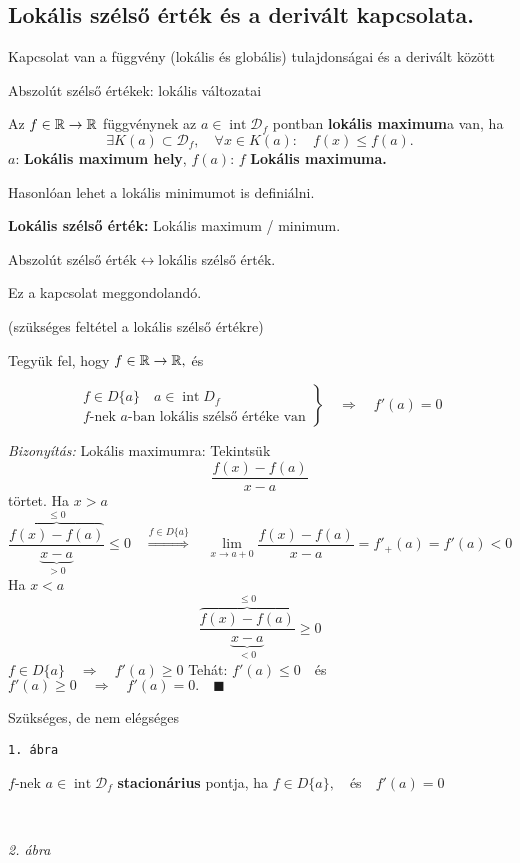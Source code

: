 \documentclass[a4paper,11.5pt]{article}
\DeclareMathOperator{\Int}{int}
\begin{document}
	\subsection{Lokális szélső érték és a derivált kapcsolata.}
	\begin{note}
		Kapcsolat van a függvény (lokális és globális) tulajdonságai és a derivált között
	\end{note}
	\begin{revision}
		Abszolút szélső értékek: lokális változatai
	\end{revision}
	\begin{definition}
		Az $f\in\mathbb{R}\to\mathbb{R}$ függvénynek az $a\in\Int \mathcal{D}_f$ pontban \textbf{lokális maximum}a van, ha
		\[ \exists K(a)\subset \mathcal{D}_f,\quad \forall x\in K(a):\quad f(x)\leq f(a). \]
		$a$: \textbf{Lokális maximum hely},
		\quad $f(a)$: $f$ \textbf{Lokális maximuma.}
		
		\medskip
		Hasonlóan lehet a lokális minimumot is definiálni.
		\medskip
		
		\textbf{Lokális szélső érték:} Lokális maximum / minimum.
	\end{definition}
	\begin{note}
		Abszolút szélső érték\quad$ \longleftrightarrow$\quad lokális szélső érték.
		
		Ez a kapcsolat meggondolandó.
	\end{note}
	\begin{theorem}
		(szükséges feltétel a lokális szélső értékre)
		
		Tegyük fel, hogy $f\in\mathbb{R}\to\mathbb{R},$ és 
		
		\[\left.\begin{gathered}
		f\in D\{a\}\quad a\in\Int D_f\\
		f\text{-nek } a\text{-ban lokális szélső értéke van}
		\end{gathered}\right\}\quad \Rightarrow\quad f'(a)=0\]
		
		\textit{Bizonyítás:} Lokális maximumra:
		Tekintsük
		\[ \frac{f(x)-f(a)}{x-a} \]
		törtet. Ha $x>a$
		\[ \frac{\overbrace{f(x)-f(a)}^{\leq 0}}{\underbrace{x-a}_{>0}}\leq 0\quad \overset{f\in D\{a\}}{\Rightarrow}\quad \lim_{x\to a+0}\frac{f(x)-f(a)}{x-a}=f'_+(a)=f'(a)<0 \]
		Ha $x<a$
		\[ \frac{\overbrace{f(x)-f(a)}^{\leq 0}}{\underbrace{x-a}_{<0}}\geq 0 \]
		$f\in D\{a\}\quad \Rightarrow\quad f'(a)\geq0$
		Tehát: $f'(a)\leq0\quad $és\quad $f'(a)\geq0\quad  \Rightarrow\quad f'(a)=0.\quad \blacksquare$
	\end{theorem}
	\begin{note}
		Szükséges, de nem elégséges
		\begin{center}
			
		\texttt{1. ábra}
		\end{center}
	\end{note}
	\begin{definition}
		$f$-nek $a\in\Int \mathcal{D}_f$ \textbf{stacionárius} pontja, ha $f\in D\{a\},\quad $és$\quad f'(a)=0$
	\end{definition}
	\begin{note}\
		
		\begin{center}
			\textit{2. ábra}
		\end{center}
	\end{note}
\end{document}
